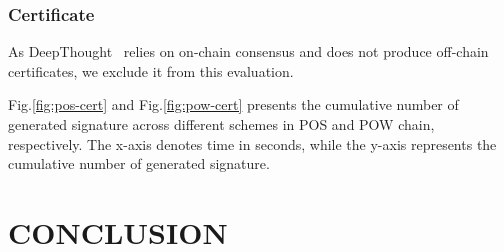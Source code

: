 \documentclass[journal]{IEEEtran}
\begin{document}
\subsubsection{Certificate}
As DeepThought~\cite{DiGennaro2022DeepThought} relies on on-chain consensus and does not produce off-chain certificates, we exclude it from this evaluation.

Fig.\ref{fig:pos-cert} and Fig.\ref{fig:pow-cert} presents the cumulative number of generated signature across different schemes in POS and POW chain, respectively. The x-axis denotes time in seconds, while the y-axis represents the cumulative number of generated signature.

\section{CONCLUSION}



\end{document}
